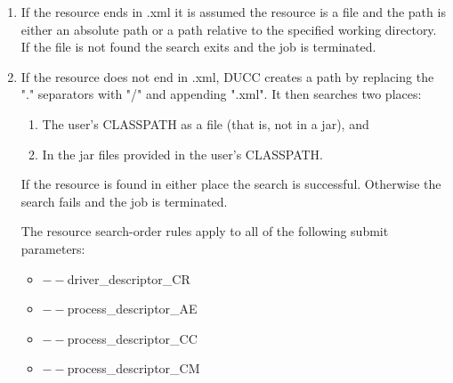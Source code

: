   \begin{enumerate}
  \item If the resource ends in .xml it is assumed the resource is a file and the path is either an 
    absolute path or a path relative to the specified working directory. If the file is not found 
    the search exits and the job is terminated. 
    
  \item If the resource does not end in .xml, DUCC creates a path by replacing the "." 
    separators with "/" and appending ".xml". It then searches two places: 
    \begin{enumerate}
    \item The user's CLASSPATH as a file (that is, not in a jar), and 
    \item In the jar files provided in the user's CLASSPATH. 
    \end{enumerate}
    If the resource is found in either place the search is successful. Otherwise the search 
    fails and the job is terminated. 
    
    The resource search-order rules apply to all of the following submit parameters: 
    \begin{itemize}
    \item[]$--$driver\_descriptor\_CR 
    \item[]$--$process\_descriptor\_AE 
    \item[]$--$process\_descriptor\_CC 
    \item[]$--$process\_descriptor\_CM 
   \end{itemize}
 \end{enumerate}
